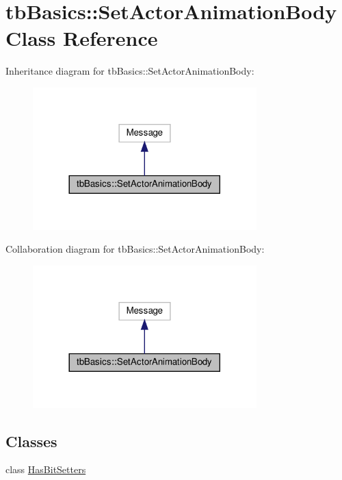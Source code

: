 \hypertarget{classtbBasics_1_1SetActorAnimationBody}{}\section{tb\+Basics\+:\+:Set\+Actor\+Animation\+Body Class Reference}
\label{classtbBasics_1_1SetActorAnimationBody}


Inheritance diagram for tb\+Basics\+:\+:Set\+Actor\+Animation\+Body\+:
\nopagebreak
\begin{figure}[H]
\begin{center}
\leavevmode
\includegraphics[width=245pt]{classtbBasics_1_1SetActorAnimationBody__inherit__graph}
\end{center}
\end{figure}


Collaboration diagram for tb\+Basics\+:\+:Set\+Actor\+Animation\+Body\+:
\nopagebreak
\begin{figure}[H]
\begin{center}
\leavevmode
\includegraphics[width=245pt]{classtbBasics_1_1SetActorAnimationBody__coll__graph}
\end{center}
\end{figure}
\subsection*{Classes}
\begin{DoxyCompactItemize}
\item 
class \hyperlink{classtbBasics_1_1SetActorAnimationBody_1_1HasBitSetters}{Has\+Bit\+Setters}
\end{DoxyCompactItemize}
